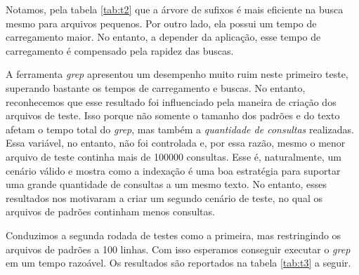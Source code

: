 \documentclass[]{article}
\begin{document}
Notamos, pela tabela \ref{tab:t2} que a árvore de sufixos é mais eficiente na busca mesmo para arquivos pequenos. Por outro lado, ela possui um tempo de carregamento maior. No entanto, a depender da aplicação, esse tempo de carregamento é compensado pela rapidez das buscas.

A ferramenta \textit{grep} apresentou um desempenho muito ruim neste primeiro teste, superando bastante os tempos de carregamento e buscas. No entanto, reconhecemos que esse resultado foi influenciado pela maneira de criação dos arquivos de teste. Isso porque não somente o tamanho dos padrões e do texto afetam o tempo total do \textit{grep}, mas também a \textit{quantidade de consultas} realizadas. Essa variável, no entanto, não foi controlada e, por essa razão, mesmo o menor arquivo de teste continha mais de 100000 consultas. Esse é, naturalmente, um cenário válido e mostra como a indexação é uma boa estratégia para suportar uma grande quantidade de consultas a um mesmo texto. No entanto, esses resultados nos motivaram a criar um segundo cenário de teste, no qual os arquivos de padrões continham menos consultas. 

Conduzimos a segunda rodada de testes como a primeira, mas restringindo os arquivos de padrões a 100 linhas. Com isso esperamos conseguir executar o \textit{grep} em um tempo razoável. Os resultados são reportados na tabela \ref{tab:t3} a seguir.
\end{document}
